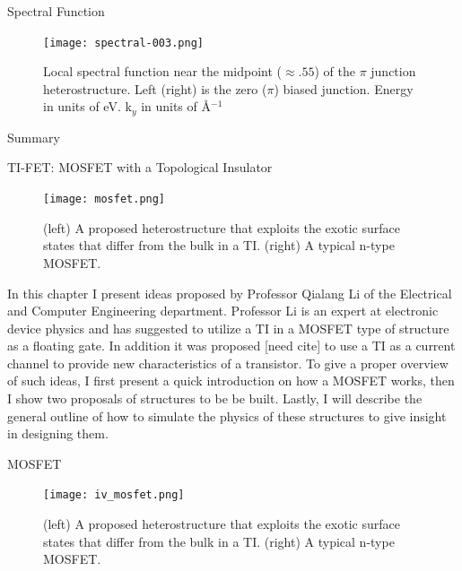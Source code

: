 \documentclass[]{beamer}
\begin{document}
\begin{frame}{Spectral Function}
\begin{figure}
\center
\texttt{[image: spectral-003.png]}
\caption{Local spectral function near the midpoint ($\approx .55$) of the $\pi$ junction heterostructure. Left (right) is the zero ($\pi$) biased junction. Energy in units of eV. k$_y$ in units of \AA$^{-1}$
}\label{spectral-jj}
\end{figure}


\end{frame}  

\begin{frame}{Summary}


\end{frame}  


\begin{frame}{TI-FET: MOSFET with a Topological Insulator}
\begin{figure}[h]
\center
\texttt{[image: mosfet.png]}
\caption{(left) A proposed heterostructure that exploits the exotic surface states that differ from the bulk in a TI. (right) A typical n-type MOSFET.
}\label{mosfet}
\end{figure}
In this chapter I present ideas proposed by Professor Qialang Li of the Electrical and Computer Engineering department. Professor Li is an expert at electronic device physics and has suggested to utilize a TI in a MOSFET type of structure as a floating gate. In addition it was proposed [need cite] to use a TI as a current channel to provide new characteristics of a transistor.  To give a proper overview of such ideas, I first present a quick introduction on how a MOSFET works, then I show two proposals of structures to be be built. Lastly, I will describe the general outline of how to simulate the physics of these structures to give insight in designing them.

\end{frame}  

\begin{frame}{MOSFET}


\begin{figure}[h]
\center
\texttt{[image: iv\_mosfet.png]}
\caption{(left) A proposed heterostructure that exploits the exotic surface states that differ from the bulk in a TI. (right) A typical n-type MOSFET.
}\label{ivmosfet}
\end{figure}

\clearpage
\end{frame}  
\end{document}
